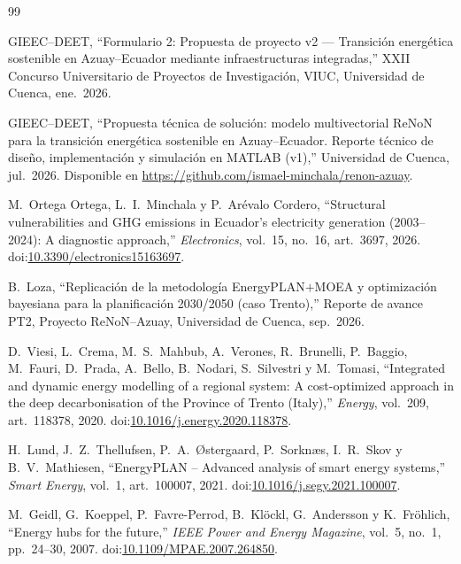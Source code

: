 \begin{thebibliography}{99}

 GIEEC--DEET, ``Formulario 2: Propuesta de proyecto v2 ---
Transici\'on energ\'etica sostenible en Azuay--Ecuador mediante infraestructuras
integradas,'' XXII Concurso Universitario de Proyectos de Investigaci\'on, VIUC,
Universidad de Cuenca, ene.~2026.

 GIEEC--DEET, ``Propuesta t\'ecnica de soluci\'on: modelo
multivectorial ReNoN para la transici\'on energ\'etica sostenible en Azuay--Ecuador.
Reporte t\'ecnico de dise\~no, implementaci\'on y simulaci\'on en MATLAB (v1),''
Universidad de Cuenca, jul.~2026. Disponible en
\url{https://github.com/ismael-minchala/renon-azuay}.

 M.~Ortega Ortega, L.~I.~Minchala y P.~Ar\'evalo Cordero,
``Structural vulnerabilities and GHG emissions in Ecuador's electricity generation
(2003--2024): A diagnostic approach,'' \emph{Electronics}, vol.~15, no.~16, art.~3697,
2026. doi:\href{https://doi.org/10.3390/electronics15163697}{10.3390/electronics15163697}.

 B.~Loza, ``Replicaci\'on de la metodolog\'ia EnergyPLAN$+$MOEA y
optimizaci\'on bayesiana para la planificaci\'on 2030/2050 (caso Trento),'' Reporte de
avance PT2, Proyecto ReNoN--Azuay, Universidad de Cuenca, sep.~2026.

 D.~Viesi, L.~Crema, M.~S.~Mahbub, A.~Verones, R.~Brunelli,
P.~Baggio, M.~Fauri, D.~Prada, A.~Bello, B.~Nodari, S.~Silvestri y M.~Tomasi,
``Integrated and dynamic energy modelling of a regional system: A cost-optimized
approach in the deep decarbonisation of the Province of Trento (Italy),''
\emph{Energy}, vol.~209, art.~118378, 2020.
doi:\href{https://doi.org/10.1016/j.energy.2020.118378}{10.1016/j.energy.2020.118378}.

 H.~Lund, J.~Z.~Thellufsen, P.~A.~{\O}stergaard, P.~Sorkn{\ae}s,
I.~R.~Skov y B.~V.~Mathiesen, ``EnergyPLAN -- Advanced analysis of smart energy
systems,'' \emph{Smart Energy}, vol.~1, art.~100007, 2021.
doi:\href{https://doi.org/10.1016/j.segy.2021.100007}{10.1016/j.segy.2021.100007}.

 M.~Geidl, G.~Koeppel, P.~Favre-Perrod, B.~Kl\"ockl,
G.~Andersson y K.~Fr\"ohlich, ``Energy hubs for the future,'' \emph{IEEE Power and
Energy Magazine}, vol.~5, no.~1, pp.~24--30, 2007.
doi:\href{https://doi.org/10.1109/MPAE.2007.264850}{10.1109/MPAE.2007.264850}.


\end{thebibliography}
